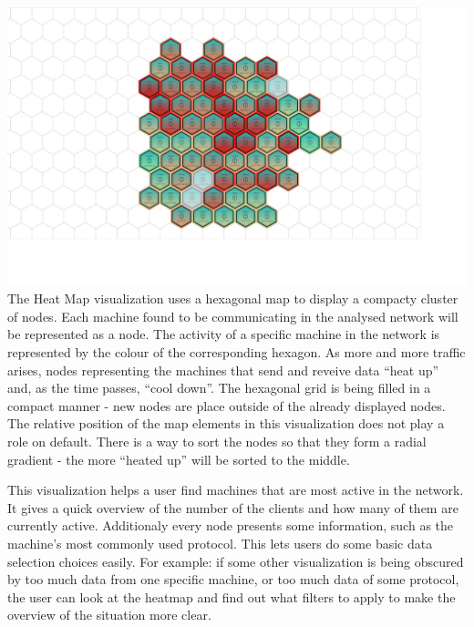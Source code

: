 \includegraphics[width=\linewidth]{materials/heat-map.jpg}
The Heat Map visualization uses a hexagonal map to display a compacty cluster of nodes.
Each machine found to be communicating in the analysed network will be represented as a node.
The activity of a specific machine in the network is represented by the colour of the 
corresponding hexagon. As more and more traffic arises, nodes representing the machines that
send and reveive data ``heat up'' and, as the time passes, ``cool down''.
The hexagonal grid is being filled in a compact manner - new nodes are place outside of 
the already displayed nodes. The relative position of the map elements in this visualization
does not play a role on default. There is a way to sort the nodes so that they form a radial 
gradient - the more ``heated up'' will be sorted to the middle.

This visualization helps a user find machines that are most active in the network.
It gives a quick overview of the number of the clients and how many of them are currently active.
Additionaly every node presents some information, such as the machine's most commonly used protocol.
This lets users do some basic data selection choices easily. For example: if some other visualization
is being obscured by too much data from one specific machine, or too much data of some protocol,
the user can look at the heatmap and find out what filters to apply to make the overview of the situation
more clear.
